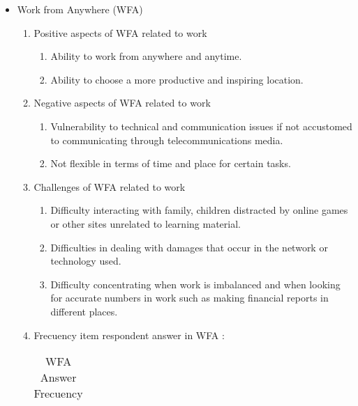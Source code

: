 \documentclass[conference]{IEEEtran}
\begin{document}
\begin{itemize}
\begin{enumerate}
\end{enumerate}
\item {Work from Anywhere (WFA)}
\begin{enumerate}
\item {Positive aspects of WFA related to work}
\begin{enumerate}
\item Ability to work from anywhere and anytime.
\item Ability to choose a more productive and inspiring location.


\end{enumerate}
\item {Negative aspects of WFA related to work}
\begin{enumerate}
\item Vulnerability to technical and communication issues if not accustomed to communicating through telecommunications media.
\item Not flexible in terms of time and place for certain tasks.
\end{enumerate}
\item Challenges of WFA related to work
\begin{enumerate}
\item Difficulty interacting with family, children distracted by online games or other sites unrelated to learning material.
\item Difficulties in dealing with damages that occur in the network or technology used.
\item Difficulty concentrating when work is imbalanced and when looking for accurate numbers in work such as making financial reports in different places.
\end{enumerate}
\item Frecuency item respondent answer in WFA :


\begin{table}[h]
\label{tab:wfa_plus_minus}
\caption{WFA Answer Frecuency}

\begin{tabular}{|l|l|l|}


\end{tabular}
\end{table}
\end{enumerate}
\end{itemize}
\end{document}
